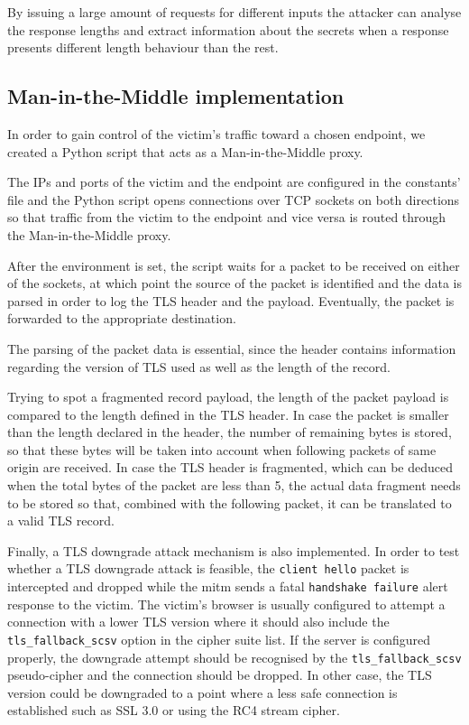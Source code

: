 By issuing a large amount of requests for different inputs the attacker can
analyse the response lengths and extract information about the secrets when a
response presents different length behaviour than the rest.

\subsection{Man-in-the-Middle implementation}

In order to gain control of the victim's traffic toward a chosen endpoint, we
created a Python script that acts as a Man-in-the-Middle proxy.

The IPs and ports of the victim and the endpoint are configured in the
constants' file and the Python script opens connections over TCP sockets on
both directions so that traffic from the victim to the endpoint and vice versa
is routed through the Man-in-the-Middle proxy.

After the environment is set, the script waits for a packet to be received on
either of the sockets, at which point the source of the packet is identified and
the data is parsed in order to log the TLS header and the payload. Eventually,
the packet is forwarded to the appropriate destination.

The parsing of the packet data is essential, since the header contains
information regarding the version of TLS used as well as the length of the
record.

Trying to spot a fragmented record payload, the length of the packet payload is
compared to the length defined in the TLS header. In case the packet is smaller
than the length declared in the header, the number of remaining bytes is stored,
so that these bytes will be taken into account when following packets of same
origin are received. In case the TLS header is fragmented, which can be deduced
when the total bytes of the packet are less than 5, the actual data fragment
needs to be stored so that, combined with the following packet, it can be
translated to a valid TLS record.

Finally, a TLS downgrade attack mechanism is also implemented. In order to test
whether a TLS downgrade attack is feasible, the \texttt{client hello} packet is
intercepted and dropped while the mitm sends a fatal \texttt{handshake failure}
alert response to the victim. The victim's browser is usually configured to
attempt a connection with a lower TLS version where it should also include the
\texttt{tls\_fallback\_scsv} option in the cipher suite list. If the server is
configured properly, the downgrade attempt should be recognised by the
\texttt{tls\_fallback\_scsv} pseudo-cipher and the connection should be dropped.
In other case, the TLS version could be downgraded to a point where a less safe
connection is established such as SSL 3.0 or using the RC4 stream cipher.

